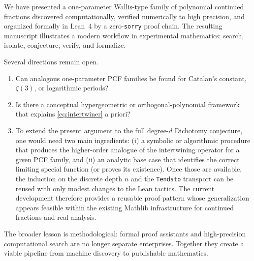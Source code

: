 \documentclass[11pt,reqno]{amsart}
\theoremstyle{plain}
\theoremstyle{definition}
\theoremstyle{remark}
\begin{document}
We have presented a one-parameter Wallis-type family of polynomial continued fractions discovered computationally, verified numerically to high precision, and organized formally in Lean~4 by a zero-\texttt{sorry} proof chain.  The resulting manuscript illustrates a modern workflow in experimental mathematics: search, isolate, conjecture, verify, and formalize.

Several directions remain open.
\begin{enumerate}[label=\textup{(\arabic*)}]
  \item Can analogous one-parameter PCF families be found for Catalan's constant, $\zeta(3)$, or logarithmic periods?
  \item Is there a conceptual hypergeometric or orthogonal-polynomial framework that explains \eqref{eq:intertwiner} a priori?
  \item To extend the present argument to the full degree-$d$ Dichotomy conjecture, one would need two main ingredients: (i) a symbolic or algorithmic procedure that produces the higher-order analogue of the intertwining operator for a given PCF family, and (ii) an analytic base case that identifies the correct limiting special function (or proves its existence).  Once those are available, the induction on the discrete depth $n$ and the \texttt{Tendsto} transport can be reused with only modest changes to the Lean tactics.  The current development therefore provides a reusable proof pattern whose generalization appears feasible within the existing Mathlib infrastructure for continued fractions and real analysis.
\end{enumerate}

The broader lesson is methodological: formal proof assistants and high-precision computational search are no longer separate enterprises.  Together they create a viable pipeline from machine discovery to publishable mathematics.
\end{document}
